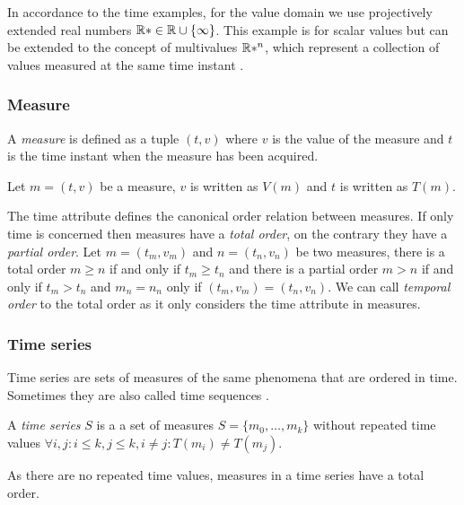 In accordance to the time examples, for the value domain we use
projectively extended real numbers $\mathbb{R}* \in \mathbb{R} \cup \{\infty\}$.  This
example is for scalar values but can be extended to the concept of
multivalues $\mathbb{R}*^n$, which represent a collection of values measured
at the same time instant \cite{assfalg08:thesis}.




\subsubsection{Measure}


\begin{definition}
  A \emph{measure} is defined as a tuple $(t,v)$ where $v$ is the
  value of the measure and $t$ is the time instant when the measure
  has been acquired.
\end{definition}

Let $m = (t,v)$ be a measure, $v$ is written as $V(m)$ and $t$ is
written as $T(m)$.

The time attribute defines the canonical order relation between
measures. If only time is concerned then measures have a \emph{total
  order}, on the contrary they have a \emph{partial order}. Let $m =
(t_m, v_m)$ and $n = (t_n, v_n)$ be two measures, there is a total
order $m\geq n$ if and only if $t_m\geq t_n$ and there is a partial
order $m > n$ if and only if $t_m > t_n$ and $m_n = n_n$ only if
$(t_m, v_m) = (t_n, v_n)$.  We can call \emph{temporal order} to the
total order as it only considers the time attribute in measures.





\subsubsection{Time series}

Time series are sets of measures of the same phenomena that are
ordered in time.  Sometimes they are also called time sequences
\cite{last:hetland}.


\begin{definition}
  A \emph{time series} $S$ is a a set of measures $S = \{m_0, \ldots,
  m_k\}$ without repeated time values $\forall i,j: i\leq k, j\leq k,
  i\neq j : T(m_i)\neq T(m_j)$.
\end{definition}

As there are no repeated time values, measures in a time series have a
total order.

